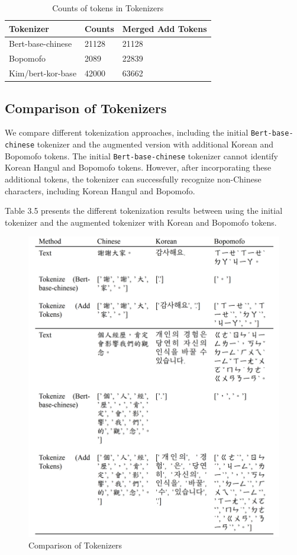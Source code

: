 \documentclass[PhD]{PHlab-thesis}
\begin{document}
\begin{table}
\begin{tabularx}{0.9\linewidth}{p{4cm} p{4cm} p{4cm}}
Tokenizer
& Counts
& Merged Add Tokens
\\
\toprule
Bert-base-chinese
& 21128
& 21128
\\
Bopomofo
&  2089
& 22839\\
Kim/bert-kor-base
& 42000
& 63662\\
\bottomrule
\end{tabularx}
\caption{Counts of tokens in Tokenizers}
\label{tab:notation}
\end{table}

\subsection{Comparison of Tokenizers}
We compare different tokenization approaches, including the initial \texttt{Bert-base-chinese} tokenizer and the augmented version with additional Korean and Bopomofo tokens. The initial \texttt{Bert-base-chinese} tokenizer cannot identify Korean Hangul and Bopomofo tokens. However, after incorporating these additional tokens, the tokenizer can successfully recognize non-Chinese characters, including Korean Hangul and Bopomofo.

Table 3.5 presents the different tokenization results between using the initial tokenizer and the augmented tokenizer with Korean and Bopomofo tokens.

\begin{figure}[h!]
  \centering
  \includegraphics[width=\linewidth]{tab_3_6.jpg}
  \captionsetup{type=table}
  \caption{Comparison of Tokenizers}
  \label{tab:compare_of_tokenizer}
\end{figure}
\end{document}
